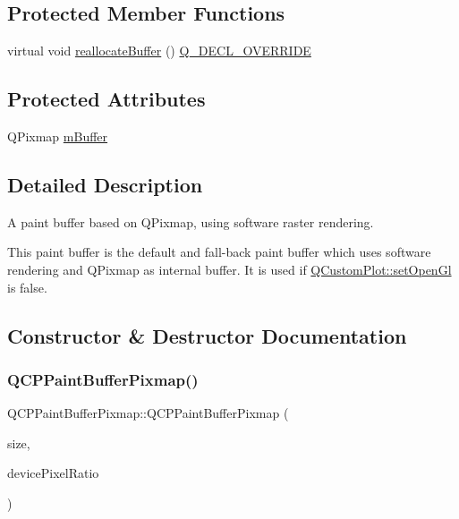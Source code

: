 \subsection*{Protected Member Functions}
\begin{DoxyCompactItemize}
\item 
virtual void \mbox{\hyperlink{class_q_c_p_paint_buffer_pixmap_ad49f3205ba3463b1c44f8db3cfcc90f0}{reallocate\+Buffer}} () \mbox{\hyperlink{qcustomplot_8h_a42cc5eaeb25b85f8b52d2a4b94c56f55}{Q\+\_\+\+D\+E\+C\+L\+\_\+\+O\+V\+E\+R\+R\+I\+DE}}
\end{DoxyCompactItemize}
\subsection*{Protected Attributes}
\begin{DoxyCompactItemize}
\item 
Q\+Pixmap \mbox{\hyperlink{class_q_c_p_paint_buffer_pixmap_a6d7009f45f03e305f2dc00e52a9225f8}{m\+Buffer}}
\end{DoxyCompactItemize}


\subsection{Detailed Description}
A paint buffer based on Q\+Pixmap, using software raster rendering. 

This paint buffer is the default and fall-\/back paint buffer which uses software rendering and Q\+Pixmap as internal buffer. It is used if \mbox{\hyperlink{class_q_custom_plot_a7db1adc09016329f3aef7c60da935789}{Q\+Custom\+Plot\+::set\+Open\+Gl}} is false. 

\subsection{Constructor \& Destructor Documentation}
\mbox{\label{class_q_c_p_paint_buffer_pixmap_aef0224e03b9285509391fcd61a8e6844}} 
\subsubsection{\texorpdfstring{QCPPaintBufferPixmap()}{QCPPaintBufferPixmap()}}
{\footnotesize\ttfamily Q\+C\+P\+Paint\+Buffer\+Pixmap\+::\+Q\+C\+P\+Paint\+Buffer\+Pixmap (\begin{DoxyParamCaption}\item[{const Q\+Size \&}]{size,  }\item[{double}]{device\+Pixel\+Ratio }\end{DoxyParamCaption})\hspace{0.3cm}{\ttfamily [explicit]}}

